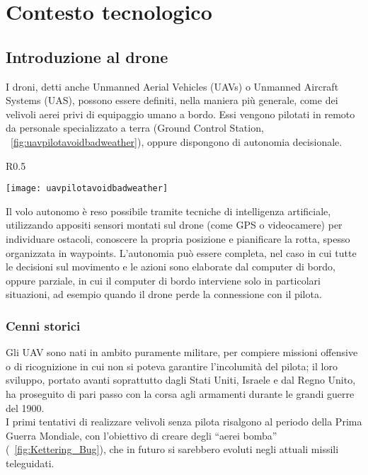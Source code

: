
\chapter{Contesto tecnologico}

\ifpdf
    \graphicspath{{Chapter2/Figs/Raster/}{Chapter2/Figs/PDF/}{Chapter2/Figs/}}
\else
    \graphicspath{{Chapter2/Figs/Vector/}{Chapter2/Figs/}}
\fi


\section[Introduzione al drone]{Introduzione al drone}

I droni, detti anche Unmanned Aerial Vehicles (UAVs) o Unmanned Aircraft Systems (UAS), possono essere definiti, nella maniera più generale, come dei velivoli aerei privi di equipaggio umano a bordo. Essi vengono pilotati in remoto da personale specializzato a terra (Ground Control Station, \figurename\ \ref{fig:uavpilotavoidbadweather}), oppure dispongono di autonomia decisionale. \\

\begin{wrapfigure}{R}{0.5\textwidth}
	\begin{center}
		\texttt{[image: uavpilotavoidbadweather]}
	\end{center}
	\caption{Pilotaggio di un drone militare da remoto.\label{fig:uavpilotavoidbadweather}}
\end{wrapfigure}

Il volo autonomo è reso possibile tramite tecniche di intelligenza artificiale, utilizzando appositi sensori montati sul drone (come GPS o videocamere) per individuare ostacoli, conoscere la propria posizione e pianificare la rotta, spesso organizzata in waypoints. 
L'autonomia può essere completa, nel caso in cui tutte le decisioni sul movimento e le azioni sono elaborate dal computer di bordo, oppure parziale, in cui il computer di bordo interviene solo in particolari situazioni, ad esempio quando il drone perde la connessione con il pilota. \\

\subsection[Cenni storici]{Cenni storici}
Gli UAV sono nati in ambito puramente militare, per compiere missioni offensive o di ricognizione in cui non si poteva garantire l'incolumità del pilota; il loro sviluppo, portato avanti soprattutto dagli Stati Uniti, Israele e dal Regno Unito, ha proseguito di pari passo con la corsa agli armamenti durante le grandi guerre del 1900. \\
I primi tentativi di realizzare velivoli senza pilota risalgono al periodo della Prima Guerra Mondiale, con l'obiettivo di creare degli “aerei bomba” (\figurename\ \ref{fig:Kettering_Bug}), che in futuro si sarebbero evoluti negli attuali missili teleguidati. 


